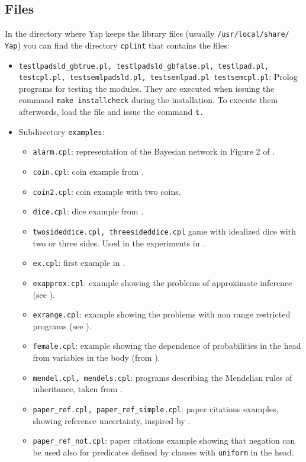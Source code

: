 \documentclass[a4paper,10pt]{article}
\begin{document}
\subsection{Files}
In the directory where Yap keeps the library files (usually \texttt{/usr/local/share/ Yap}) you can find the directory \texttt{cplint} that contains the files:
\begin{itemize}
\item \texttt{testlpadsld\_gbtrue.pl, testlpadsld\_gbfalse.pl, testlpad.pl,
testcpl.pl, testsemlpadsld.pl, testsemlpad.pl testsemcpl.pl}: Prolog programs for testing the modules. They are executed when issuing the command \texttt{make installcheck} during the installation. To execute them afterwords, load the file and issue the command \texttt{t.} 
\item Subdirectory \texttt{examples}:
\begin{itemize}
\item \texttt{alarm.cpl}: representation of the Bayesian network in Figure 2 of
 \cite{VenVer04-ICLP04-IC}.
\item \texttt{coin.cpl}: coin example from   \cite{VenVer04-ICLP04-IC}.
\item \texttt{coin2.cpl}: coin example with two coins.
\item \texttt{dice.cpl}: dice example from \cite{VenVer04-ICLP04-IC}.
\item \verb|twosideddice.cpl, threesideddice.cpl|  game with idealized dice with two or three  sides. Used in the experiments in \cite{Rig-RCRA07-IC}.
\item \texttt{ex.cpl}: first example in \cite{Rig-RCRA07-IC}.
\item \texttt{exapprox.cpl}: example showing the problems of approximate inference (see \cite{Rig-RCRA07-IC}).
\item \texttt{exrange.cpl}: example showing the problems with non range restricted programs (see \cite{Rig-RCRA07-IC}).
\item \texttt{female.cpl}: example showing the dependence of probabilities in the head from variables in the body (from \cite{VenVer04-ICLP04-IC}).
\item \texttt{mendel.cpl, mendels.cpl}: programs describing the Mendelian rules of inheritance, taken from \cite{Blo04-ILP04WIP-IC}.
\item \verb|paper_ref.cpl, paper_ref_simple.cpl|: paper citations examples, showing reference uncertainty, inspired by \cite{Getoor+al:JMLR02}.
\item \verb|paper_ref_not.cpl|: paper citations example showing that negation can be used also for predicates defined by clauses with \texttt{uniform} in the head.

\end{itemize}
\end{itemize}
\end{document}
